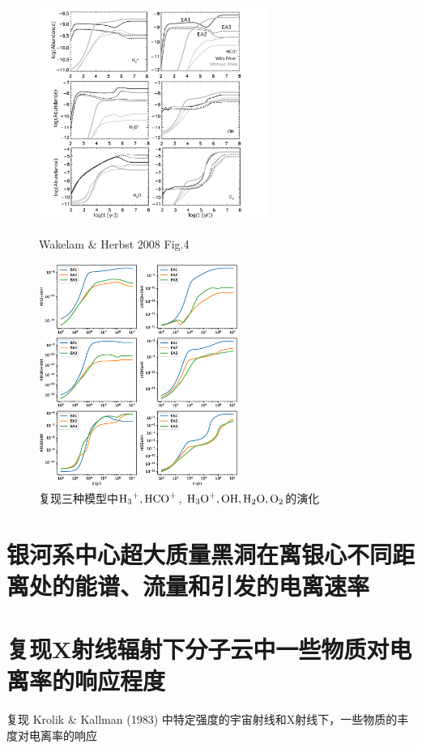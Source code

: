 \documentclass[UTF8]{article}
\begin{document}
\begin{fangsong}
\begin{figure}[htbp]
	\centering
	\begin{minipage}[t]{0.49\textwidth}
		\centering
		\includegraphics[width=7.5cm]{Wakelam2.png}
		\caption{Wakelam \& Herbst 2008 Fig.4}
	\end{minipage}
	\begin{minipage}[t]{0.49\textwidth}
		\centering
		\includegraphics[width=6.5cm]{2.eps}
		\caption{复现三种模型中$\ce{H3+,HCO+}$, $\ce{H3O+,OH,H2O,O2}$的演化}
	\end{minipage}
\end{figure}

\section{银河系中心超大质量黑洞在离银心不同距离处的能谱、流量和引发的电离速率}
\section{复现X射线辐射下分子云中一些物质对电离率的响应程度}
复现 Krolik \& Kallman (1983) 中特定强度的宇宙射线和X射线下，一些物质的丰度对电离率的响应 
\end{fangsong}
\end{document}
